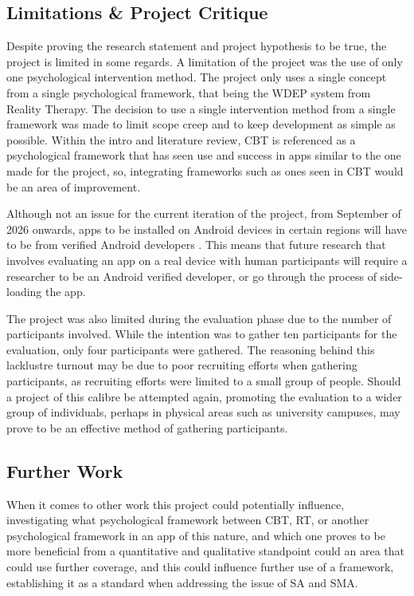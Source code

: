 \documentclass[12pt]{article}
\begin{document}
\subsection{Limitations \& Project Critique}
Despite proving the research statement and project hypothesis to be true, the project is limited in some regards. A limitation of the project was the use of only one 
psychological intervention method. The project only uses a single concept from a single psychological framework, that being the WDEP system from Reality Therapy. The 
decision to use a single intervention method from a single framework was made to limit scope creep and to keep development as simple as possible. Within the intro and
literature review, CBT is referenced as a psychological framework that has seen use and success in apps similar to the one made for the project, so, integrating
frameworks such as ones seen in CBT would be an area of improvement. \newline

Although not an issue for the current iteration of the project, from September of 2026 onwards, apps to be installed on Android devices in certain regions will have to be from verified Android 
developers . This means that future research that involves evaluating an app on a real device with human participants will require a researcher to be an Android verified developer, or go through 
the process of side-loading the app. \newline

The project was also limited during the evaluation phase due to the number of participants involved. While the intention was to gather ten participants for the evaluation, only four participants 
were gathered. The reasoning behind this lacklustre turnout may be due to poor recruiting efforts when gathering participants, as recruiting efforts were limited to a small group of people. 
Should a project of this calibre be attempted again, promoting the evaluation to a wider group of individuals, perhaps in physical areas such as university campuses, may prove to be an effective 
method of gathering participants.

\subsection{Further Work}
When it comes to other work this project could potentially influence, investigating what psychological framework between CBT, RT, or another psychological framework 
in an app of this nature, and which one proves to be more beneficial from a quantitative and qualitative standpoint could an area that could use further coverage, and this 
could influence further use of a framework, establishing it as a standard when addressing the issue of SA and SMA. \newline
\end{document}
